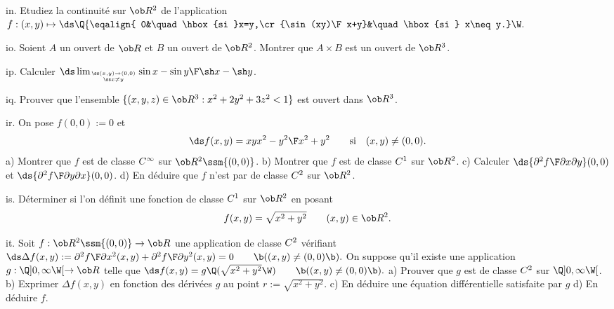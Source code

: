 \exo [Level=2,Fight=2,Learn=1,Type=\Exercices,Field=\Continuité,Origin=] in. 
Etudiez la continuité sur $\ob R^2$ de l'application 
$f:(x,y)\mapsto \ds\Q\{\eqalign{
0&\quad\hbox{si }x=y,\cr
{\sin(xy)\F x+y}&\quad\hbox{si } x\neq y.}\W.$

\exo [Level=2,Fight=0,Learn=1,Type=\Cours,Field=\Topologie,Origin=] io. 
Soient $A$ un ouvert de $\ob R$ et $B$ un ouvert de $\ob R^2$. 
Montrer que $A\times B$ est un ouvert de $\ob R^3$. 

\exo [Level=2,Fight=2,Learn=1,Type=\Exercices,Field=\Continuité,Origin=] ip. 
Calculer $\ds\lim_{\ss(x,y)\to(0,0)\atop\ss x\neq y}{\sin x-\sin y\F\sh x-\sh y}$. 

\exo [Level=2,Fight=0,Learn=1,Type=\Cours,Field=\Topologie,Origin=] iq. 
Prouver que l'ensemble $\{(x,y,z)\in\ob R^3:x^2+2y^2+3z^2<1\}$ est ouvert dans $\ob R^3$. 

\exo [Level=2,Fight=1,Learn=2,Type=\Cours,Field=\Dérivation,Origin=] ir. %
On pose $f(0,0):=0$ et $$
\ds f(x,y)=xy{x^2-y^2\F x^2+y^2}\qquad \hbox{si}\quad (x,y)\neq(0,0).
$$
a) Montrer que $f$ est de classe $\sc C^\infty$ sur $\ob R^2\ssm\{(0,0)\}$. \medskip\noindent
b) Montrer que $f$ est de classe $\sc C^1$ sur $\ob R^2$. \medskip\noindent
c) Calculer $\ds{\partial^2f\F\partial x\partial y}(0,0)$ et $\ds{\partial^2f\F\partial y\partial x}(0,0)$. \medskip\noindent
d) En déduire que $f$ n'est par de classe $\sc C^2$ sur $\ob R^2$. 


\exo [Level=2,Fight=0,Learn=1,Type=\TravauxDirigés,Field=\Dérivation,Origin=] is. 
Déterminer si l'on définit une fonction de classe $\sc C^1$ sur $\ob R^2$ en posant 
$$
f(x,y)=\sqrt{x^2+y^2}\qquad (x,y)\in\ob R^2.
$$ 


\exo [Level=2,Fight=2,Learn=2,Type=\TravauxDirigés,Field=\EquationsAuxDérivéesPartielles,Origin=] it. 
Soit $f:\ob R^2\ssm\{(0,0)\}\to\ob R$ une application de classe $\sc C^2$ 
vérifiant 
\medskip\hfill
$\ds
\Delta f(x,y):={\partial^2f\F\partial x^2}(x,y)+{\partial^2f\F\partial y^2}(x,y)=0\qquad\b((x,y)\neq(0,0)\b). 
$\hfill\null\medskip\noindent
On suppose qu'il existe une application $g:\Q]0,\infty\W[\to\ob R$ telle que 
\medskip\hfill$\ds 
f(x,y)=g\Q(\sqrt{x^2+y^2}\W)\qquad\b((x,y)\neq(0,0)\b).
$\hfill\null\medskip\noindent
a) Prouver que $g$ est de classe $\sc C^2$ sur $\Q]0,\infty\W[$. \smallskip
\noindent
b) Exprimer $\Delta f(x,y)$ en fonction des dérivées $g$ au point $r:=\sqrt{x^2+y^2}$. 
\smallskip\noindent 
c) En déduire une équation différentielle satisfaite par $g$
\smallskip\noindent
d) En déduire $f$. 

